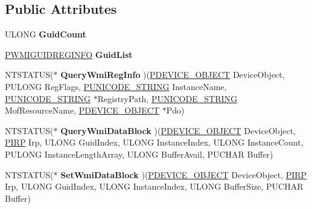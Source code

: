 \subsection*{Public Attributes}
\begin{DoxyCompactItemize}
\item 
\hypertarget{struct__WMILIB__CONTEXT_aa16f8beae75323e23103db090ff2652a}{}U\+L\+O\+N\+G {\bfseries Guid\+Count}\label{struct__WMILIB__CONTEXT_aa16f8beae75323e23103db090ff2652a}

\item 
\hypertarget{struct__WMILIB__CONTEXT_a44ab06773cc9a03efee269a0c9e7a9f4}{}\hyperlink{struct____anonstruct__WMIGUIDREGINFO__114}{P\+W\+M\+I\+G\+U\+I\+D\+R\+E\+G\+I\+N\+F\+O} {\bfseries Guid\+List}\label{struct__WMILIB__CONTEXT_a44ab06773cc9a03efee269a0c9e7a9f4}

\item 
\hypertarget{struct__WMILIB__CONTEXT_a937ae3391c029983426b61607854420f}{}N\+T\+S\+T\+A\+T\+U\+S($\ast$ {\bfseries Query\+Wmi\+Reg\+Info} )(\hyperlink{struct__DEVICE__OBJECT}{P\+D\+E\+V\+I\+C\+E\+\_\+\+O\+B\+J\+E\+C\+T} Device\+Object, P\+U\+L\+O\+N\+G Reg\+Flags, \hyperlink{struct__UNICODE__STRING}{P\+U\+N\+I\+C\+O\+D\+E\+\_\+\+S\+T\+R\+I\+N\+G} Instance\+Name, \hyperlink{struct__UNICODE__STRING}{P\+U\+N\+I\+C\+O\+D\+E\+\_\+\+S\+T\+R\+I\+N\+G} $\ast$Registry\+Path, \hyperlink{struct__UNICODE__STRING}{P\+U\+N\+I\+C\+O\+D\+E\+\_\+\+S\+T\+R\+I\+N\+G} Mof\+Resource\+Name, \hyperlink{struct__DEVICE__OBJECT}{P\+D\+E\+V\+I\+C\+E\+\_\+\+O\+B\+J\+E\+C\+T} $\ast$Pdo)\label{struct__WMILIB__CONTEXT_a937ae3391c029983426b61607854420f}

\item 
\hypertarget{struct__WMILIB__CONTEXT_aa61e3c16126d00c37ebe5c9d68f526e3}{}N\+T\+S\+T\+A\+T\+U\+S($\ast$ {\bfseries Query\+Wmi\+Data\+Block} )(\hyperlink{struct__DEVICE__OBJECT}{P\+D\+E\+V\+I\+C\+E\+\_\+\+O\+B\+J\+E\+C\+T} Device\+Object, \hyperlink{struct__IRP}{P\+I\+R\+P} Irp, U\+L\+O\+N\+G Guid\+Index, U\+L\+O\+N\+G Instance\+Index, U\+L\+O\+N\+G Instance\+Count, P\+U\+L\+O\+N\+G Instance\+Length\+Array, U\+L\+O\+N\+G Buffer\+Avail, P\+U\+C\+H\+A\+R Buffer)\label{struct__WMILIB__CONTEXT_aa61e3c16126d00c37ebe5c9d68f526e3}

\item 
\hypertarget{struct__WMILIB__CONTEXT_afbf0bc8092bbae8101c978e39b2b36a2}{}N\+T\+S\+T\+A\+T\+U\+S($\ast$ {\bfseries Set\+Wmi\+Data\+Block} )(\hyperlink{struct__DEVICE__OBJECT}{P\+D\+E\+V\+I\+C\+E\+\_\+\+O\+B\+J\+E\+C\+T} Device\+Object, \hyperlink{struct__IRP}{P\+I\+R\+P} Irp, U\+L\+O\+N\+G Guid\+Index, U\+L\+O\+N\+G Instance\+Index, U\+L\+O\+N\+G Buffer\+Size, P\+U\+C\+H\+A\+R Buffer)\label{struct__WMILIB__CONTEXT_afbf0bc8092bbae8101c978e39b2b36a2}


\end{DoxyCompactItemize}
